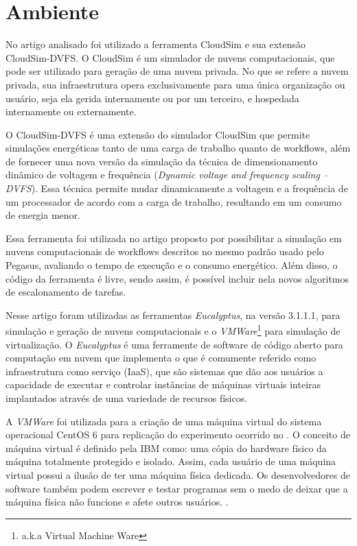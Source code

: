 \section{Ambiente}

No artigo analisado foi utilizado a ferramenta CloudSim e sua extensão CloudSim-DVFS. O CloudSim é
um simulador de nuvens computacionais, que pode ser utilizado para geração de uma nuvem privada.
No que se refere a nuvem privada, sua infraestrutura opera exclusivamente para uma única organização ou usuário,
seja ela gerida internamente ou por um terceiro, e hospedada internamente ou externamente.

O CloudSim-DVFS é uma extensão do simulador CloudSim que permite simulações energéticas tanto de uma
carga de trabalho quanto de workflows, além de fornecer uma nova versão da simulação da técnica
de dimensionamento dinâmico de voltagem e frequência (\textit{Dynamic voltage and frequency scaling – DVFS}).
Essa técnica permite mudar dinamicamente a voltagem e a frequência de um processador de acordo com
a carga de trabalho, resultando em um consumo de energia menor. \cite{elaine_et_al:14}

Essa ferramenta foi utilizada no artigo \cite{elaine_et_al:14} proposto por possibilitar a simulação em nuvens computacionais
de workflows descritos no mesmo padrão usado pelo Pegasus, avaliando o tempo de execução e o consumo energético.
Além disso, o código da ferramenta é livre, sendo assim, é possível incluir nela novos algoritmos de escalonamento de tarefas.

Nesse artigo foram utilizadas as ferramentas \textit{Eucalyptus}, na versão 3.1.1.1, para simulação e geração de nuvens computacionais e o \textit{VMWare}\footnote{a.k.a Virtual Machine Ware} para simulação de virtualização. O \textit{Eucalyptus}
é uma ferramente de software de código aberto para computação em nuvem que implementa o que é comumente referido
como infraestrutura como serviço (IaaS), que são sistemas que dão aos usuários a capacidade de executar e controlar
instâncias de máquinas virtuais inteiras implantados através de uma variedade de recursos físicos. \cite{nurmi_2009}

A \textit{VMWare} foi utilizada para a criação de uma máquina virtual do sistema operacional CentOS 6 para replicação do experimento
ocorrido no \cite{elaine_et_al:14}. O conceito de máquina virtual é definido pela IBM como: uma cópia do hardware físico da máquina totalmente protegido
e isolado. Assim, cada usuário de uma máquina virtual possui a ilusão de ter uma máquina física dedicada.
Os desenvolvedores de software também podem escrever e testar programas sem o medo de deixar que a máquina física
não funcione e afete outros usuários. \cite{sugerman2001virtualizing}.
